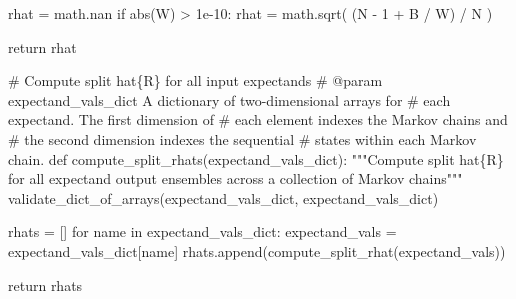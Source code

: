 \documentclass[
  letterpaper,
  DIV=11,
  numbers=noendperiod]{scrartcl}
\newenvironment{Shaded}{\begin{snugshade}}{\end{snugshade}}
\newcommand{\BuiltInTok}[1]{\textcolor[rgb]{0.00,0.23,0.31}{#1}}
\newcommand{\CommentTok}[1]{\textcolor[rgb]{0.37,0.37,0.37}{#1}}
\newcommand{\ControlFlowTok}[1]{\textcolor[rgb]{0.00,0.23,0.31}{#1}}
\newcommand{\DecValTok}[1]{\textcolor[rgb]{0.68,0.00,0.00}{#1}}
\newcommand{\FloatTok}[1]{\textcolor[rgb]{0.68,0.00,0.00}{#1}}
\newcommand{\KeywordTok}[1]{\textcolor[rgb]{0.00,0.23,0.31}{#1}}
\newcommand{\NormalTok}[1]{\textcolor[rgb]{0.00,0.23,0.31}{#1}}
\newcommand{\OperatorTok}[1]{\textcolor[rgb]{0.37,0.37,0.37}{#1}}
\newcommand{\StringTok}[1]{\textcolor[rgb]{0.13,0.47,0.30}{#1}}
\begin{document}
\begin{Shaded}
\begin{Highlighting}[]
\NormalTok{  rhat }\OperatorTok{=}\NormalTok{ math.nan}
  \ControlFlowTok{if} \BuiltInTok{abs}\NormalTok{(W) }\OperatorTok{\textgreater{}} \FloatTok{1e{-}10}\NormalTok{:}
\NormalTok{    rhat }\OperatorTok{=}\NormalTok{ math.sqrt( (N }\OperatorTok{{-}} \DecValTok{1} \OperatorTok{+}\NormalTok{ B }\OperatorTok{/}\NormalTok{ W) }\OperatorTok{/}\NormalTok{ N )}
  
  \ControlFlowTok{return}\NormalTok{ rhat}
\end{Highlighting}
\end{Shaded}

\begin{Shaded}
\begin{Highlighting}[]
\CommentTok{\# Compute split hat\{R\} for all input expectands}
\CommentTok{\# @param expectand\_vals\_dict A dictionary of two{-}dimensional arrays for}
\CommentTok{\#                            each expectand.  The first dimension of}
\CommentTok{\#                            each element indexes the Markov chains and}
\CommentTok{\#                            the second dimension indexes the sequential}
\CommentTok{\#                            states within each Markov chain.}
\KeywordTok{def}\NormalTok{ compute\_split\_rhats(expectand\_vals\_dict):}
  \CommentTok{"""Compute split hat\{R\} for all expectand output ensembles across}
\CommentTok{     a collection of Markov chains"""}
\NormalTok{  validate\_dict\_of\_arrays(expectand\_vals\_dict, }\StringTok{\textquotesingle{}expectand\_vals\_dict\textquotesingle{}}\NormalTok{)}
    
\NormalTok{  rhats }\OperatorTok{=}\NormalTok{ []}
  \ControlFlowTok{for}\NormalTok{ name }\KeywordTok{in}\NormalTok{ expectand\_vals\_dict:}
\NormalTok{    expectand\_vals }\OperatorTok{=}\NormalTok{ expectand\_vals\_dict[name]}
\NormalTok{    rhats.append(compute\_split\_rhat(expectand\_vals))}
  
  \ControlFlowTok{return}\NormalTok{ rhats}
\end{Highlighting}
\end{Shaded}
\end{document}
